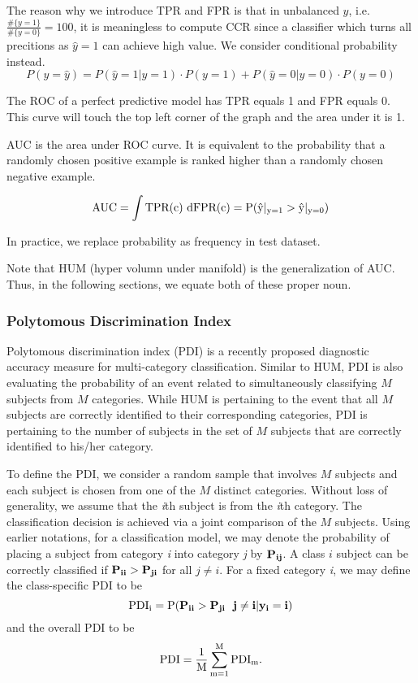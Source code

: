 \documentclass[]{article}
\begin{document}
The reason why we introduce TPR and FPR is that in unbalanced $y$, i.e. $ \frac{\#\{y=1\}}{\#\{y=0\}}=100 $, it is meaningless to compute CCR since a classifier which turns all precitions as $\hat{y}=1$ can achieve high value. We consider conditional probability instead.
\begin{equation}
	P(y=\hat{y})=P(\hat{y}=1|y=1)\cdot P(y=1)+P(\hat{y}=0|y=0)\cdot P(y=0)
\end{equation}

The ROC of a perfect predictive model has TPR equals 1 and FPR equals 0. This curve will touch the top left corner of the graph and the area under it is 1.

AUC is the area under ROC curve. It is equivalent to the probability that a randomly chosen positive example is ranked higher than a randomly chosen negative example\cite{fawcett2006introduction}.

\begin{equation}
	\rm AUC=\int \rm TPR(c) \ \mathrm{d}\rm FPR(c)=P(\hat{y}|_{y=1}>\hat{y}|_{y=0})
\end{equation}

In practice, we replace probability as frequency in test dataset.

Note that HUM (hyper volumn under manifold)\cite{li2008roc} is the generalization of AUC. Thus, in the following sections, we equate both of these proper noun.


\subsubsection{Polytomous Discrimination Index}
Polytomous discrimination index (PDI)\cite{van2012assessing} is a recently proposed diagnostic accuracy measure for multi-category classification. Similar to HUM, PDI is also evaluating the probability of an event related to simultaneously classifying $ M $
subjects from $ M $ categories. While HUM is pertaining to the event that all $ M $ subjects are correctly
identified to their corresponding categories, PDI is pertaining to the number of subjects in the set of $ M $ subjects that are correctly identified to his/her category. 

To define the PDI, we consider a random sample that involves $ M $ subjects and each subject is
chosen from one of the $ M $ distinct categories. Without loss of generality, we assume that the \textit{i}th subject is from the
\textit{i}th category. The classification decision is achieved via a joint comparison of the $ M $ subjects. Using earlier notations, for a classification model, we may denote the probability of placing a subject from category \textit{i} into category \textit{j} by $ \bf P_{ij} $. A class $i$ subject can be correctly classified if $\bf P_{ii}>\bf P_{ji}$ for all $j \neq i$. For a fixed category \textit{i}, we may define the class-specific PDI to be
\begin{equation}
\rm PDI_i=P(\bf P_{ii}>\bf P_{ji} \ \ j \neq i|y_i=i)
\end{equation}
and the overall PDI to be
\begin{equation}
\rm PDI=\frac{1}{M}\sum_{m=1}^M \rm PDI_m.
\end{equation}
\end{document}
